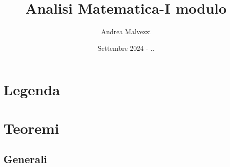 \documentclass[12pt]{article}
\title{\textbf{Analisi Matematica-I modulo}}
\date{Settembre 2024 - ..}
\author{Andrea Malvezzi}
\begin{document}
\maketitle

\pagebreak
\tableofcontents

\pagebreak
\section{Legenda}

\pagebreak
\section{Teoremi}

\subsection{Generali}
\end{document}
